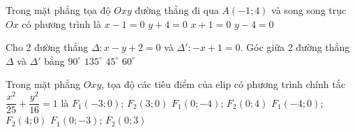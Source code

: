 \begin{ex}%
Trong mặt phẳng tọa độ $Oxy$ đường thẳng đi qua $A(-1; 4)$ và song song trục $Ox$ có phương trình là
\choice
{$x-1=0$}
{$y+4=0$}
{$x+1=0$}
{\True $y-4=0$}
\end{ex}

\begin{ex}%
Cho 2 đường thẳng $\Delta\colon x-y+2=0$ và $\Delta'\colon-x+1=0$. Góc giữa 2 đường thẳng $\Delta$ và $\Delta'$ bằng
\choice
{$90^{\circ}$}
{$135^{\circ}$}
{\True $45^\circ$}
{$60^{\circ}$}
\end{ex}

\begin{ex}%
Trong mặt phẳng $O x y$, tọa độ các tiêu điểm của elip có phương trình chính tắc  $\dfrac{x^2}{25}+\dfrac{y^2}{16}=1$ là
\choice
{\True $F_1(-3 ; 0)$; $F_2(3 ; 0)$}
{$F_1(0 ;-4)$; $F_2(0 ; 4)$}
{$F_1(-4 ; 0)$; $F_2(4 ; 0)$}
{$F_1(0 ;-3)$; $F_2(0 ; 3)$}
\end{ex}

